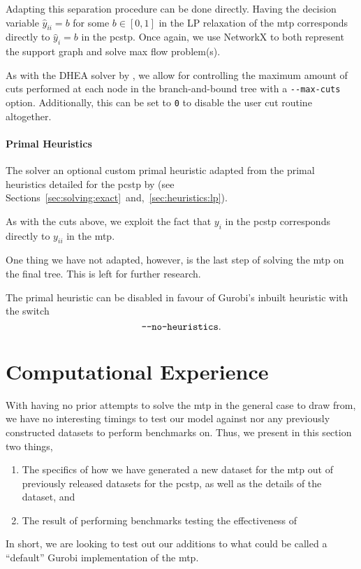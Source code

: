 Adapting this separation procedure can be done directly. Having the decision variable
$\hat y_{ii} = b$ for some $b \in [0,1]$ in the LP relaxation of
the \gls{mtp} corresponds directly to $\hat y_i = b$ in the \gls{pcstp}.
Once again, we use NetworkX to both represent the support graph and solve max flow problem(s).

As with the DHEA solver by \citet{ljubic2005solving}, we allow for controlling the maximum amount
of cuts performed at each node in the branch-and-bound tree
with a \texttt{-{}-max-cuts} option. Additionally, this can be set
to \texttt{0} to disable the user cut routine altogether.

\paragraph{Primal Heuristics}
The solver an optional custom primal heuristic adapted from the primal heuristics detailed
for the \gls{pcstp} by \citet{ljubic2005solving}
(see Sections~\ref{sec:solving:exact}~and,~\ref{sec:heuristics:lp}).

As with the cuts above, we exploit the fact that $y_i$ in the \gls{pcstp}
corresponds directly to $y_{ii}$ in the \gls{mtp}.

One thing we have not adapted, however, is the last step of solving the \gls{mtp}
on the final tree. This is left for further research.

The primal heuristic can be disabled in favour of Gurobi's inbuilt heuristic with
the switch \[\texttt{-{}-no-heuristics}\mathnormal{.}\]
\section{Computational Experience}
With having no prior attempts to solve the \gls{mtp} in the general case to draw from,
we have no interesting timings to test our model against nor any previously constructed
datasets to perform benchmarks on. Thus, we present in this section two things,
\begin{enumerate}
\item The specifics of how we have generated a new dataset for the \gls{mtp} out of previously released
  datasets for the \gls{pcstp},
  as well as the details of the dataset, and
\item The result of performing benchmarks testing the effectiveness of
\end{enumerate}
In short, we are looking to test out our additions to what could be called a ``default'' Gurobi
implementation of the \gls{mtp}.

